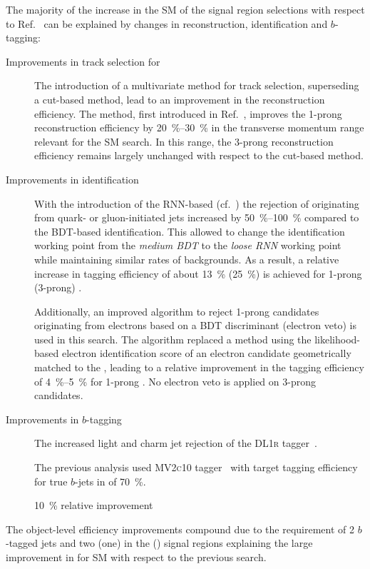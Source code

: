 The majority of the increase in the SM \HH \AccTimesEff of the signal
region selections with respect to Ref.~\cite{HIGG-2016-16-witherratum}
can be explained by changes in \tauhadvis reconstruction,
identification and $b$-tagging:
\begin{description}

\item[Improvements in track selection for \tauhadvis] The introduction
  of a multivariate method for \tauhadvis track selection, superseding
  a cut-based method, lead to an improvement in the \tauhadvis
  reconstruction efficiency. The method, first introduced in
  Ref.~\cite{duschinger}, improves the 1-prong \tauhadvis
  reconstruction efficiency by \SIrange{20}{30}{\percent} in the
  \tauhadvis transverse momentum range relevant for the SM \HH
  search. In this range, the 3-prong \tauhadvis reconstruction
  efficiency remains largely unchanged with respect to the cut-based
  method.

\item[Improvements in \tauhadvis identification] With the introduction
  of the RNN-based \tauid (cf.~) the rejection of
  \tauhadvis originating from quark- or gluon-initiated jets increased
  by \SIrange{50}{100}{\percent} compared to the BDT-based
  identification. This allowed to change the identification working
  point from the \emph{medium BDT} to the \emph{loose RNN} working
  point while maintaining similar rates of \faketauhadvis
  backgrounds. As a result, a relative increase in \tauhadvis tagging
  efficiency of about \SI{13}{\percent} (\SI{25}{\percent}) is
  achieved for 1-prong (3-prong) \tauhadvis.

  Additionally, an improved algorithm to reject 1-prong \tauhadvis
  candidates originating from electrons based on a BDT discriminant
  (electron veto) is used in this search. The algorithm replaced a
  method using the likelihood-based electron identification score of
  an electron candidate geometrically matched to the \tauhadvis,
  leading to a relative improvement in the tagging efficiency of
  \SIrange{4}{5}{\percent} for 1-prong \tauhadvis. No electron veto is
  applied on 3-prong \tauhadvis candidates.

\item[Improvements in $b$-tagging]
  The increased light and charm jet rejection of the \textsc{DL1r}
  tagger~\cite{ATL-PHYS-PUB-2017-013}.

  The previous analysis used \textsc{MV2c10}
  tagger~\cite{ATL-PHYS-PUB-2016-012} with target tagging efficiency
  for true $b$-jets in \ttbar of \SI{70}{\percent}.

  \SI{10}{\percent} relative improvement
\end{description}
The object-level efficiency improvements compound due to the
requirement of 2 $b$-tagged jets and two (one) \tauhadvis in the
\hadhad (\lephad) signal regions explaining the large improvement in
\AccTimesEff for SM \HH with respect to the previous
search.


